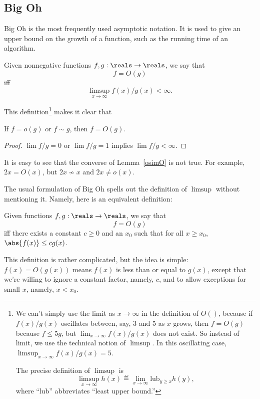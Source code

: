 \subsection{Big Oh}

Big Oh is the most frequently used asymptotic notation.  It is used to
give an upper bound on the growth of a function, such as the running
time of an algorithm.
\begin{definition}
Given nonnegative functions $f, g : \reals \to \reals$, we
say that
\[
f = O(g)
\]
iff
\[
\limsup_{x \rightarrow \infty} f(x)/g(x) < \infty.
\]
\end{definition}
This definition\footnote{We can't simply use the limit as
$x \rightarrow \infty$ in the definition of $O()$, because if
$f(x)/g(x)$ oscillates between, say, 3 and 5 as $x$ grows, then $f =
O(g)$ because $f
\leq 5g$, but $\lim_{x \rightarrow \infty} f(x)/g(x)$ does not exist.
So instead of limit, we use the technical notion of $\limsup$.  In
this oscillating case, $\limsup_{x \rightarrow \infty} f(x)/g(x) = 5$.

The precise definition of $\limsup$ is
\[
\limsup_{x \rightarrow \infty} h(x) \eqdef \lim_{x \rightarrow \infty}
\text{lub}_{y \geq x} h(y),
\]
where ``lub'' abbreviates ``least upper bound.''} makes it clear that
\begin{lemma}\label{osimO}
If $f = o(g)$ or $f \sim g$, then $f = O(g)$.
\end{lemma}
\begin{proof}
$\lim f/g=0$ or $\lim f/g=1$ implies $\lim f/g<\infty$.
\end{proof}

It is easy to see that the converse of Lemma~\ref{osimO} is not true.  For
example, $2x = O(x)$, but $2x \not\sim x$ and $2x \neq o(x)$.

The usual formulation of Big Oh spells out the definition of $\limsup$
without mentioning it.  Namely, here is an equivalent definition:
\begin{definition}\label{def:O}
Given functions $f, g : \reals \to \reals$, we say that
\[
f = O(g)
\]
iff there exists a constant $c \geq 0$ and an $x_0$ such that for all $x \geq
x_0$, $\abs{f(x)} \leq c g(x)$.
\end{definition}

This definition is rather complicated, but the idea is simple: $f(x) =
O(g(x))$ means $f(x)$ is less than or equal to $g(x)$, except that we're
willing to ignore a constant factor, namely, $c$, and to allow exceptions for
small $x$, namely, $x < x_0$.

